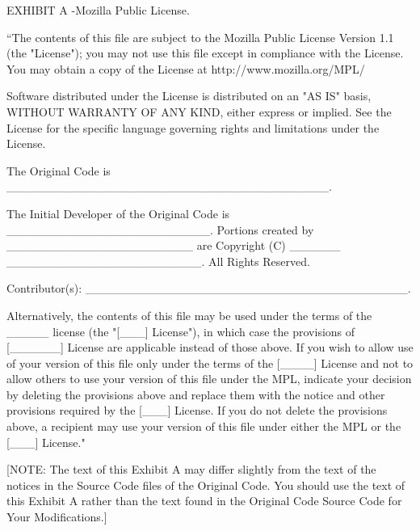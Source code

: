 E\+X\+H\+I\+B\+I\+T A -\/\+Mozilla Public License. \begin{DoxyVerb} ``The contents of this file are subject to the Mozilla Public License
 Version 1.1 (the "License"); you may not use this file except in
 compliance with the License. You may obtain a copy of the License at
 http://www.mozilla.org/MPL/

 Software distributed under the License is distributed on an "AS IS"
 basis, WITHOUT WARRANTY OF ANY KIND, either express or implied. See the
 License for the specific language governing rights and limitations
 under the License.

 The Original Code is ______________________________________.

 The Initial Developer of the Original Code is ________________________.
 Portions created by ______________________ are Copyright (C) ______
 _______________________. All Rights Reserved.

 Contributor(s): ______________________________________.

 Alternatively, the contents of this file may be used under the terms
 of the _____ license (the  "[___] License"), in which case the
 provisions of [______] License are applicable instead of those
 above.  If you wish to allow use of your version of this file only
 under the terms of the [____] License and not to allow others to use
 your version of this file under the MPL, indicate your decision by
 deleting  the provisions above and replace  them with the notice and
 other provisions required by the [___] License.  If you do not delete
 the provisions above, a recipient may use your version of this file
 under either the MPL or the [___] License."

 [NOTE: The text of this Exhibit A may differ slightly from the text of
 the notices in the Source Code files of the Original Code. You should
 use the text of this Exhibit A rather than the text found in the
 Original Code Source Code for Your Modifications.]\end{DoxyVerb}
 